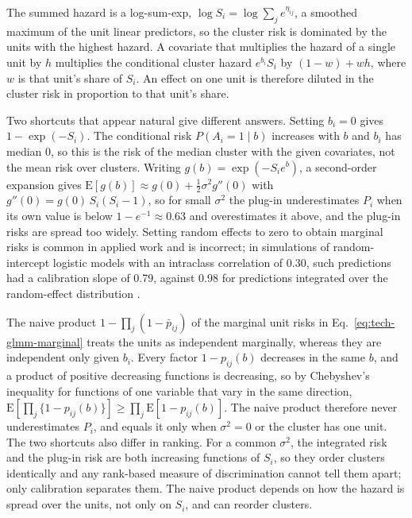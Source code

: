 The summed hazard is a log-sum-exp, $\log S_i = \log \sum_j e^{\eta_{ij}}$, a smoothed maximum of the unit linear predictors, so the cluster risk is dominated by the units with the highest hazard.
A covariate that multiplies the hazard of a single unit by $h$ multiplies the conditional cluster hazard $e^{b_i} S_i$ by $(1 - w) + w h$, where $w$ is that unit's share of $S_i$.
An effect on one unit is therefore diluted in the cluster risk in proportion to that unit's share.

Two shortcuts that appear natural give different answers.
Setting $b_i = 0$ gives $1 - \exp(-S_i)$.
The conditional risk $P(A_i = 1 \mid b)$ increases with $b$ and $b_i$ has median 0, so this is the risk of the median cluster with the given covariates, not the mean risk over clusters.
Writing $g(b) = \exp(-S_i e^{b})$, a second-order expansion gives $\mathrm{E}[g(b)] \approx g(0) + \tfrac{1}{2}\sigma^2 g''(0)$ with $g''(0) = g(0)\, S_i (S_i - 1)$, so for small $\sigma^2$ the plug-in underestimates $P_i$ when its own value is below $1 - e^{-1} \approx 0.63$ and overestimates it above, and the plug-in risks are spread too widely.
Setting random effects to zero to obtain marginal risks is common in applied work and is incorrect; in simulations of random-intercept logistic models with an intraclass correlation of 0.30, such predictions had a calibration slope of 0.79, against 0.98 for predictions integrated over the random-effect distribution \cite{pavlou2015marginal}.

The naive product $1 - \prod_j (1 - \bar{p}_{ij})$ of the marginal unit risks in Eq.~\eqref{eq:tech-glmm-marginal} treats the units as independent marginally, whereas they are independent only given $b_i$.
Every factor $1 - p_{ij}(b)$ decreases in the same $b$, and a product of positive decreasing functions is decreasing, so by Chebyshev's inequality for functions of one variable that vary in the same direction, $\mathrm{E}\left[\prod_j \{1 - p_{ij}(b)\}\right] \ge \prod_j \mathrm{E}\left[1 - p_{ij}(b)\right]$.
The naive product therefore never underestimates $P_i$, and equals it only when $\sigma^2 = 0$ or the cluster has one unit.
The two shortcuts also differ in ranking.
For a common $\sigma^2$, the integrated risk and the plug-in risk are both increasing functions of $S_i$, so they order clusters identically and any rank-based measure of discrimination cannot tell them apart; only calibration separates them.
The naive product depends on how the hazard is spread over the units, not only on $S_i$, and can reorder clusters.


